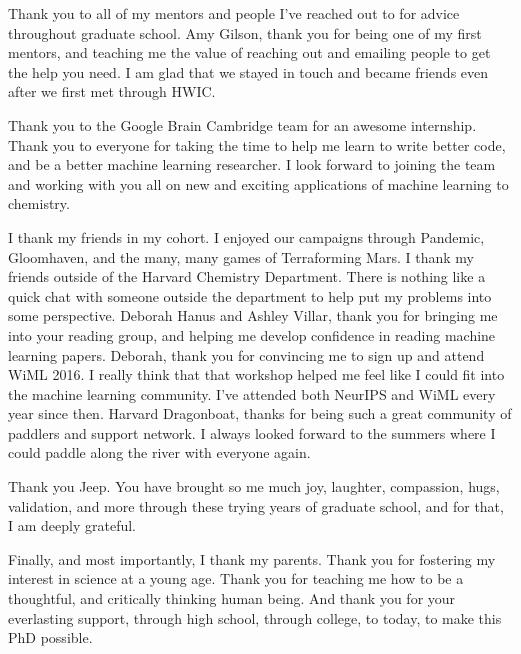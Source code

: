 Thank you to all of my mentors and people I've reached out to for advice throughout graduate school. Amy Gilson, thank you for being one of my first mentors, and teaching me the value of reaching out and emailing people to get the help you need. I am glad that we stayed in touch and became friends even after we first met through HWIC.

Thank you to the Google Brain Cambridge team for an awesome internship. Thank you to everyone for taking the time to help me learn to write better code, and be a better machine learning researcher. I look forward to joining the team and working with you all on new and exciting applications of machine learning to chemistry.

I thank my friends in my cohort. I enjoyed our campaigns through Pandemic, Gloomhaven, and the many, many games of Terraforming Mars.
I thank my friends outside of the Harvard Chemistry Department. There is nothing like a quick chat with someone outside the department to help put my problems into some perspective.
Deborah Hanus and Ashley Villar, thank you for bringing me into your reading group, and helping me develop confidence in reading machine learning papers. Deborah, thank you for convincing me to sign up and attend WiML 2016.
I really think that that workshop helped me feel like I could fit into the machine learning community. I've attended both NeurIPS and WiML every year since then.
Harvard Dragonboat, thanks for being such a great community of paddlers and support network. I always looked forward to the summers where I could paddle along the river with everyone again.

Thank you Jeep. You have brought so me much joy, laughter, compassion, hugs, validation, and more through these trying years of graduate school, and for that, I am deeply grateful.

Finally, and most importantly, I thank my parents. Thank you for fostering my interest in science at a young age. Thank you for teaching me how to be a thoughtful, and critically thinking human being. And thank you for your everlasting support, through high school, through college, to today, to make this PhD possible.
